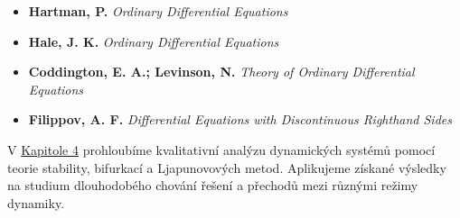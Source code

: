\vspace{0.5cm}

\begin{tcolorbox}[title=\textbf{Doporučená literatura}, colback=blue!5!white, colframe=blue!75!black]
\begin{itemize}
\item \textbf{Hartman, P.} \emph{Ordinary Differential Equations}
\item \textbf{Hale, J. K.} \emph{Ordinary Differential Equations}  
\item \textbf{Coddington, E. A.; Levinson, N.} \emph{Theory of Ordinary Differential Equations}
\item \textbf{Filippov, A. F.} \emph{Differential Equations with Discontinuous Righthand Sides}
\end{itemize}
\end{tcolorbox}

\begin{transition}
V \hyperref[sec:pokrocila-teorie]{Kapitole 4} prohloubíme kvalitativní analýzu dynamických systémů pomocí teorie stability, bifurkací a Ljapunovových metod. Aplikujeme získané výsledky na studium dlouhodobého chování řešení a přechodů mezi různými režimy dynamiky.
\end{transition}

\spc